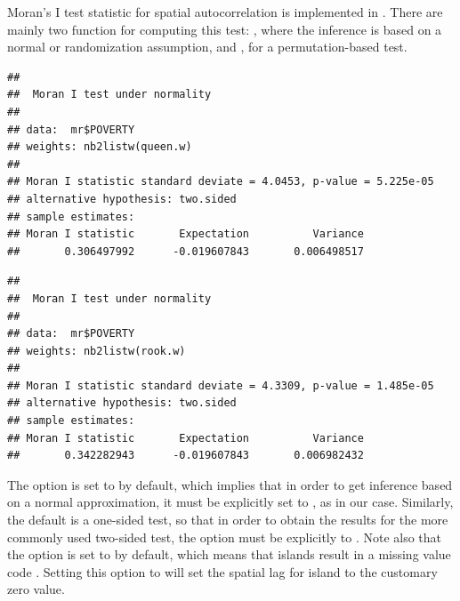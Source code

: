Moran's I test statistic for spatial autocorrelation is implemented in  \citep{spdep}. There are mainly two function for computing this test: , where the inference is based on a normal or randomization assumption, and , for a permutation-based test. 

\begin{knitrout}
\color{fgcolor}\begin{kframe}
\begin{alltt}
\hlopt{$}  \hlstd{=}   \hlstd{=} \hlstd{,}
            \hlstd{=} \hlstd{)}
\end{alltt}
\begin{verbatim}
## 
## 	Moran I test under normality
## 
## data:  mr$POVERTY  
## weights: nb2listw(queen.w)    
## 
## Moran I statistic standard deviate = 4.0453, p-value = 5.225e-05
## alternative hypothesis: two.sided
## sample estimates:
## Moran I statistic       Expectation          Variance 
##       0.306497992      -0.019607843       0.006498517
\end{verbatim}
\begin{alltt}
\hlopt{$}  \hlstd{=}   \hlstd{=} \hlstd{,}
            \hlstd{=} \hlstd{)}
\end{alltt}
\begin{verbatim}
## 
## 	Moran I test under normality
## 
## data:  mr$POVERTY  
## weights: nb2listw(rook.w)    
## 
## Moran I statistic standard deviate = 4.3309, p-value = 1.485e-05
## alternative hypothesis: two.sided
## sample estimates:
## Moran I statistic       Expectation          Variance 
##       0.342282943      -0.019607843       0.006982432
\end{verbatim}
\end{kframe}
\end{knitrout}

The  option is set to  by default, which implies that in order to get inference based on a normal approximation, it must be explicitly set to , as in our case. Similarly, the default is a one-sided test, so that in order to obtain the results for the more commonly used two-sided test, the option  must be explicitly to . Note also that the  option is set to  by default, which means that islands result in a missing value code . Setting this option to  will set the spatial lag for island to the customary zero value. 

